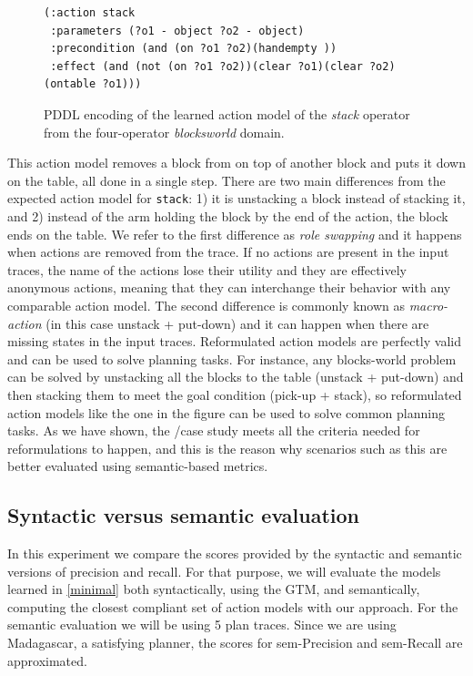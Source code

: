 \begin{figure}[hbt!]
	\begin{footnotesize}
		\begin{verbatim}
(:action stack
 :parameters (?o1 - object ?o2 - object)
 :precondition (and (on ?o1 ?o2)(handempty ))
 :effect (and (not (on ?o1 ?o2))(clear ?o1)(clear ?o2)(ontable ?o1)))
		\end{verbatim}
	\end{footnotesize}
	\caption{PDDL encoding of the learned action model of the {\em stack} operator from the four-operator {\em blocksworld} domain.}
	\label{fig:macroaction}
\end{figure}

This action model removes a block from on top of another block and puts it down on the table, all done in a single step. There are two main differences from the expected action model for {\tt stack}: 1) it is unstacking a block instead of stacking it, and 2) instead of the arm holding the block by the end of the action, the block ends on the table. We refer to the first difference as \emph{role swapping} and it happens when actions are removed from the trace. If no actions are present in the input traces, the name of the actions lose their utility and they are effectively anonymous actions, meaning that they can interchange their behavior with any comparable action model. The second difference is commonly known as \emph{macro-action} (in this case unstack + put-down) and it can happen when there are missing states in the input traces. Reformulated action models are perfectly valid and can be used to solve planning tasks. For instance, any blocks-world problem can be solved by unstacking all the blocks to the table (unstack + put-down) and then stacking them to meet the goal condition (pick-up + stack), so reformulated action models like the one in the figure can be used to solve common planning tasks. As we have shown, the \NO/\NO case study meets all the criteria needed for reformulations to happen, and this is the reason why scenarios such as this are better evaluated using semantic-based metrics.






\subsection{Syntactic versus semantic evaluation}

In this experiment we compare the scores provided by the syntactic and semantic versions of precision and recall. For that purpose, we will evaluate the models learned in \ref{minimal} both syntactically, using the GTM, and semantically, computing the closest compliant set of action models with our approach. For the semantic evaluation we will be using 5 plan traces. Since we are using {\sc Madagascar}, a satisfying planner, the scores for sem-Precision and sem-Recall are approximated.

